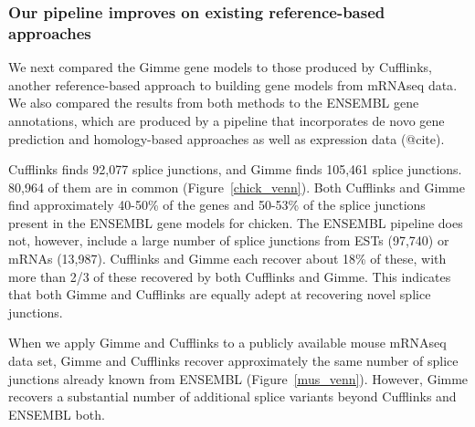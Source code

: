 \documentclass[10pt]{article}
\begin{document}

\subsubsection*{Our pipeline improves on existing reference-based approaches}

We next compared the Gimme gene models to those produced by Cufflinks,
another reference-based approach to building gene models from mRNAseq
data\cite{Trapnell:2010kd}.  We also compared the results from both
methods to the ENSEMBL gene annotations, which are produced by a
pipeline that incorporates de novo gene prediction and homology-based
approaches as well as expression data (@cite).

Cufflinks finds 92,077 splice junctions, and Gimme finds 105,461 splice
junctions.  80,964 of them are in common (Figure~\ref{chick_venn}). Both
Cufflinks and Gimme find approximately 40-50\% of the genes and 50-53\% of the
splice junctions present in the ENSEMBL gene models for chicken.  The ENSEMBL
pipeline does not, however, include a large number of splice junctions from ESTs
(97,740) or mRNAs (13,987).  Cufflinks and Gimme each recover about 18\% of
these, with more than 2/3 of these recovered by both Cufflinks and Gimme.  This
indicates that both Gimme and Cufflinks are equally adept at recovering novel
splice junctions.



When we apply Gimme and Cufflinks to a publicly available mouse mRNAseq data
set, Gimme and Cufflinks recover approximately the same number of splice
junctions already known from ENSEMBL (Figure~\ref{mus_venn}).  However, Gimme
recovers a substantial number of additional splice variants beyond Cufflinks and
ENSEMBL both.


\end{document}
